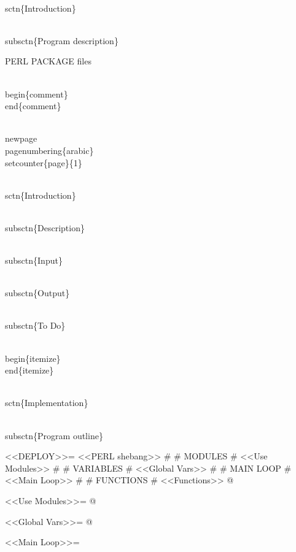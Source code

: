 \documentclass[11pt]{article}
\def\nwendcode{\endtrivlist \endgroup} %
\let\nwdocspar=\par                    %
\begin{document}
\\sctn\{Introduction\}

\\subsctn\{Program description\}

\LA{}PERL PACKAGE files~{\nwtagstyle{}}\RA{}

\\begin\{comment\}
\\end\{comment\}

\nwendcode{}\nwdocspar

\nwenddocs{}\endmoddef

\\newpage
\\pagenumbering\{arabic\}
\\setcounter\{page\}\{1\}

\\sctn\{Introduction\}

\\subsctn\{Description\}

\\subsctn\{Input\}

\\subsctn\{Output\}


\\subsctn\{To Do\}

\\begin\{itemize\}
 \
\\end\{itemize\}

\\sctn\{Implementation\}

\\subsctn\{Program outline\}

<<DEPLOY>>=
<<PERL shebang>>
#
# MODULES
#
<<Use Modules>>
#
# VARIABLES
#
<<Global Vars>>
#
# MAIN LOOP
#
<<Main Loop>>
#
# FUNCTIONS
#
<<Functions>>
@ 

<<Use Modules>>=
@

<<Global Vars>>=
@

<<Main Loop>>=
\end{document}
